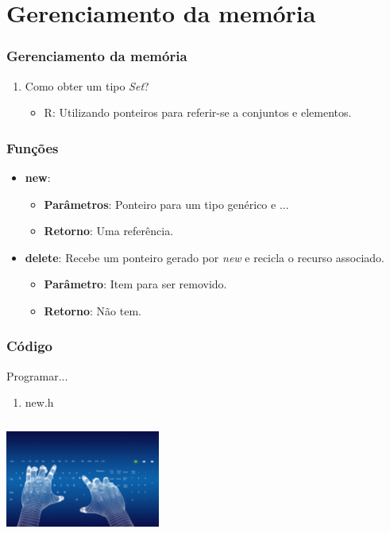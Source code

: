 \documentclass{beamer}
\begin{document}
\section{Gerenciamento da memória}
\begin{frame}
 \frametitle{Gerenciamento da memória}
 \begin{enumerate}
  \item Como obter um tipo \textit{Set}?
  \begin{itemize}
   \item R: Utilizando ponteiros para referir-se a conjuntos e elementos.
  \end{itemize}
 \end{enumerate}

\end{frame}

\begin{frame}
 \frametitle{Funções}
  \begin{itemize}
   \item \textbf{new}: 
    \begin{itemize}
     \item \textbf{Parâmetros}: Ponteiro para um tipo genérico e ...
     \item \textbf{Retorno}: Uma referência.
    \end{itemize}

   \item \textbf{delete}: Recebe um ponteiro gerado por \textit{new} e recicla 
    o recurso associado.
    \begin{itemize}
     \item \textbf{Parâmetro}: Item para ser removido.
     \item \textbf{Retorno}: Não tem.
    \end{itemize}

  \end{itemize}
\end{frame}

\begin{frame}
  \frametitle{Código}
  Programar...
  \begin{enumerate}
   \item new.h
  \end{enumerate}

  \begin{center}
    \includegraphics[height = 1.5in, width = 2in]{image/programming.jpg}
  \end{center}
\end{frame}
\end{document}
